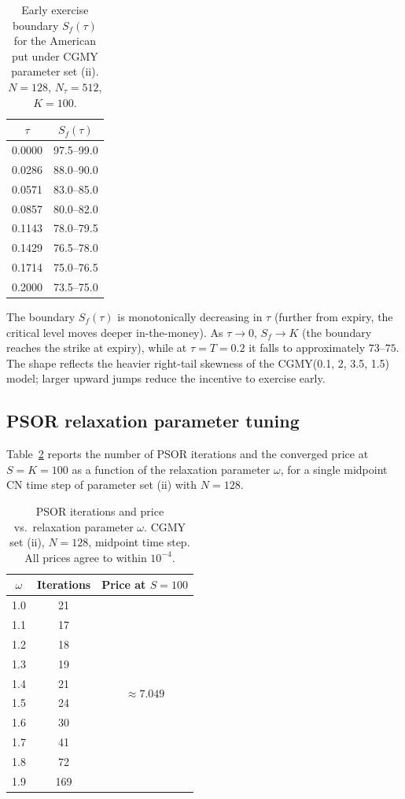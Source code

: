 \documentclass[11pt,a4paper]{article}
\begin{document}
\begin{table}[ht]
\centering
\caption{Early exercise boundary $S_f(\tau)$ for the American put under
  CGMY parameter set (ii). $N=128$, $N_\tau=512$, $K=100$.}
\label{tab:boundary}
\begin{tabular}{cc}
\toprule
$\tau$ & $S_f(\tau)$ \\
\midrule
0.0000 & 97.5--99.0 \\
0.0286 & 88.0--90.0 \\
0.0571 & 83.0--85.0 \\
0.0857 & 80.0--82.0 \\
0.1143 & 78.0--79.5 \\
0.1429 & 76.5--78.0 \\
0.1714 & 75.0--76.5 \\
0.2000 & 73.5--75.0 \\
\bottomrule
\end{tabular}
\end{table}

The boundary $S_f(\tau)$ is monotonically decreasing in $\tau$ (further from
expiry, the critical level moves deeper in-the-money). As $\tau\to 0$,
$S_f\to K$ (the boundary reaches the strike at expiry), while at $\tau=T=0.2$
it falls to approximately $73$--$75$.  The shape reflects the heavier right-tail
skewness of the CGMY(0.1, 2, 3.5, 1.5) model; larger upward jumps reduce the
incentive to exercise early.

\subsection{PSOR relaxation parameter tuning}

Table~\ref{tab:sor} reports the number of PSOR iterations and the converged
price at $S=K=100$ as a function of the relaxation parameter $\omega$, for
a single midpoint CN time step of parameter set (ii) with $N=128$.

\begin{table}[ht]
\centering
\caption{PSOR iterations and price vs.\ relaxation parameter $\omega$.
  CGMY set (ii), $N=128$, midpoint time step. All prices agree to within
  $10^{-4}$.}
\label{tab:sor}
\begin{tabular}{ccc}
\toprule
$\omega$ & Iterations & Price at $S=100$ \\
\midrule
1.0 & 21 & \multirow{10}{*}{$\approx 7.049$} \\
1.1 & 17 &  \\
1.2 & 18 &  \\
1.3 & 19 &  \\
1.4 & 21 &  \\
1.5 & 24 &  \\
1.6 & 30 &  \\
1.7 & 41 &  \\
1.8 & 72 &  \\
1.9 & 169 & \\
\bottomrule
\end{tabular}
\end{table}
\end{document}
